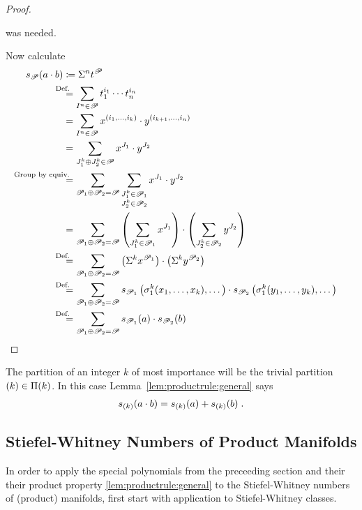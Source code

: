 \begin{Lem}
\begin{proof}
\begin{itemize}
      was needed.
    \end{itemize}
    Now calculate
    \begin{align*}
      \s{\Part}(a\cdot b)
      &\coloneqq
        \symm{n} t^{\Part}
      \\ &\equalsby{Def.}
           \sum_{I^n\in\Part}
           t_1^{i_1}\dotsm t_n^{i_n}
      \\ &=
           \sum_{I^n\in\Part}
           x^{(i_1,\dotsc,i_k)}\cdot y^{(i_{k+1},\dotsc,i_n)}
      \\ &=
           \sum_{J_1^k\concat J_2^k\in\Part}
           x^{J_1} \cdot y^{J_2}
      \\ &\equalsby{Group by equiv.}
           \sum_{\Part_1\concat \Part_2=\Part}
           \sum_{\substack{J_1^k\in\Part_1\\ J_2^k\in\Part_2}}
      x^{J_1} \cdot y^{J_2}
      \\ &=
           \sum_{\Part_1\concat \Part_2=\Part}
           \left(\sum_{J_1^k\in\Part_1} x^{J_1}\right)
           \cdot
           \left(\sum_{J_2^k\in\Part_2} y^{J_2}\right)
      \\ &\equalsby{Def.}
           \sum_{\Part_1\concat \Part_2=\Part}
           \left(\symm{k} x^{\Part_1}\right)
           \cdot
           \left(\symm{k} y^{\Part_2}\right)
      \\ &\equalsby{Def.}
           \sum_{\Part_1\concat \Part_2=\Part}
           \s{\Part_1}\left( \el 1 k(x_1,\dotsc,x_k),\dotsc \right)
           \cdot
           \s{\Part_2}\left( \el 1 k(y_1,\dotsc,y_k),\dotsc \right)
      \\ &\equalsby{Def.}
           \sum_{\Part_1\concat \Part_2=\Part}
           \s{\Part_1}(a) \cdot \s{\Part_2}(b)
           \qedhere
    \end{align*}
  \end{proof}
\end{Lem}

\begin{Ex}
  The partition of an integer $k$ of most importance will be the trivial
  partition $(k)\in\Pi({k})$. In this case
  Lemma~\autoref{lem:productrule:general} says
  \begin{gather*}
    s_{(k)}(a\cdot b) = s_{(k)}(a) + s_{(k)}(b)
    \;.
  \end{gather*}
\end{Ex}


\subsection{Stiefel-Whitney Numbers of Product Manifolds}
In order to apply the special polynomials from the preceeding section
and their their product property \autoref{lem:productrule:general} to
the Stiefel-Whitney numbers of (product) manifolds, first start with application
to Stiefel-Whitney classes.

